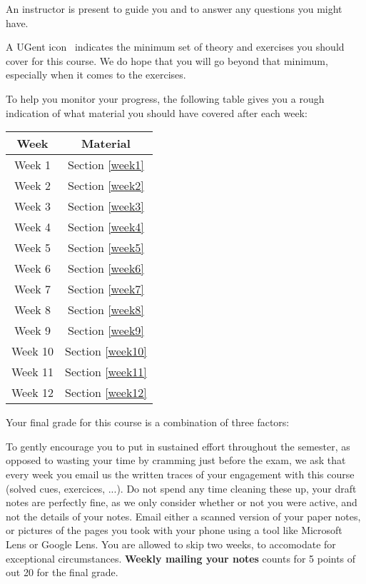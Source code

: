 An instructor is present to guide you and to answer any questions you might have.

A UGent icon \iconoffset\ugent\, indicates the minimum set of theory and exercises you should cover for this course. We do hope that you will go beyond that minimum, especially when it comes to the exercises.

To help you monitor your progress, the following table gives you a rough indication of what material you should have covered after each week:

\begin{center}
\begin{tabular}{ |c|c| } 
 \hline
  \textbf{Week} & \textbf{Material} \\
  \hline
 Week 1 & Section \ref{week1} \\ 
 Week 2 & Section \ref{week2} \\
 Week 3 & Section \ref{week3} \\
 Week 4 & Section \ref{week4} \\
 Week 5 & Section \ref{week5} \\
 Week 6 & Section \ref{week6} \\ 
 Week 7 & Section \ref{week7} \\
 Week 8 & Section \ref{week8} \\
 Week 9 & Section \ref{week9} \\
 Week 10 & Section \ref{week10}  \\
 Week 11 & Section \ref{week11} \\ 
 Week 12 & Section \ref{week12} \\
 \hline
\end{tabular}
\end{center}

Your final grade for this course is a combination of three factors:

To gently encourage you to put in sustained effort throughout the semester, as opposed to wasting your time by cramming just before the exam, we ask that every week you email us the written traces of your engagement with this course (solved cues, exercices, ...). Do not spend any time cleaning these up, your draft notes are perfectly fine, as we only consider whether or not you were active, and not the details of your notes. Email either a scanned version of your paper notes, or pictures of the pages you took with your phone using a tool like Microsoft Lens or Google Lens. You are allowed to skip two weeks, to accomodate for exceptional circumstances. \textbf{Weekly mailing your notes} counts for 5 points of out 20 for the final grade.

